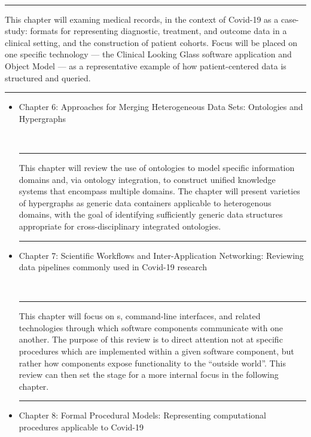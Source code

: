 \documentclass{statsoc}
\newcommand{\textscc}[1]{{\color{orr!35!black}{{%
						\fontfamily{Cabin-TLF}\fontseries{b}\selectfont{\textsc{\scriptsize{#1}}}}}}}
\newcommand{\AcronymText}[1]{{\textscc{#1}}}
\newcommand{\q}[1]{{\fontfamily{qcr}\selectfont ``}#1{\fontfamily{qcr}\selectfont ''}}
\newcommand{\API}{\resizebox{!}{7pt}{\AcronymText{API}}}
\newenvironment{summary}{\\\vspace{-4pt}%
%
%
\noindent\hfil\textcolor{rgrey!50!purple}{\rule{0.5\textwidth}{.4pt}}\hfil

\hspace{-2cm}\begin{minipage}{1.02\textwidth}\fontfamily{phv}\fontsize{9}{11}\selectfont}%
{\\\vspace{-1em}\end{minipage}
{\begin{center}\textcolor{rgrey!50!yellow}{\rule{0.5\textwidth}{.4pt}}\end{center}}
\vspace{2em}}%
\begin{document}
{\begin{description}
\begin{itemize}
\begin{summary}
This chapter will examing medical records, in the context of 
Covid-19 as a case-study: formats for representing 
diagnostic, treatment, and outcome data in a clinical setting, 
and the construction of patient cohorts.  Focus will be 
placed on one specific technology --- the 
Clinical Looking Glass software application and Object Model --- 
as a representative example of how patient-centered 
data is structured and queried.
\end{summary}

\end{itemize}

\item[Part II: Creating a Cross-Disciplinary Ecosystem for Covid-19]

\begin{itemize}

\item Chapter 6: Approaches for Merging Heterogeneous Data Sets: Ontologies and Hypergraphs

\begin{summary}
This chapter will review the use of ontologies to model 
specific information domains and, via ontology integration, 
to construct unified knowledge systems that encompass 
multiple domains.  The chapter will present varieties 
of hypergraphs as generic data containers applicable 
to heterogenous domains, with the goal of identifying 
sufficiently generic data structures appropriate 
for cross-disciplinary integrated ontologies.   
\end{summary}

\item Chapter 7: Scientific Workflows and Inter-Application Networking: Reviewing data pipelines commonly used in Covid-19 research

\begin{summary}
This chapter will focus on \API{}s, command-line interfaces, 
and related technologies through which software components 
communicate with one another.  The purpose of this review is 
to direct attention not at specific procedures which are 
implemented within a given software component, but rather 
how components expose functionality to the 
\q{outside world}.  This review can then set the 
stage for a more internal focus in the following chapter. 
\end{summary}

\item Chapter 8: Formal Procedural Models: Representing computational procedures applicable 
to Covid-19


\end{itemize}
\end{description}}
\end{document}
